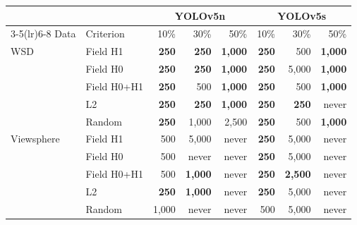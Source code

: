 \begin{tabular}{llrrrrrr}
\toprule
 & & \multicolumn{3}{c}{YOLOv5n} & \multicolumn{3}{c}{YOLOv5s} \\
\cmidrule(lr){3-5}\cmidrule(lr){6-8}
Data & Criterion & 10\% & 30\% & 50\% & 10\% & 30\% & 50\% \\
\midrule
WSD & Field H1 & \textbf{250} & \textbf{250} & \textbf{1,000} & \textbf{250} & 500 & \textbf{1,000} \\
 & Field H0 & \textbf{250} & \textbf{250} & \textbf{1,000} & \textbf{250} & 5,000 & \textbf{1,000} \\
 & Field H0+H1 & \textbf{250} & 500 & \textbf{1,000} & \textbf{250} & 500 & \textbf{1,000} \\
 & L2 & \textbf{250} & \textbf{250} & \textbf{1,000} & \textbf{250} & \textbf{250} & never \\
 & Random & \textbf{250} & 1,000 & 2,500 & \textbf{250} & 500 & \textbf{1,000} \\
\midrule
Viewsphere & Field H1 & 500 & 5,000 & never & \textbf{250} & 5,000 & never \\
 & Field H0 & 500 & never & never & \textbf{250} & 5,000 & never \\
 & Field H0+H1 & 500 & \textbf{1,000} & never & \textbf{250} & \textbf{2,500} & never \\
 & L2 & \textbf{250} & \textbf{1,000} & never & \textbf{250} & 5,000 & never \\
 & Random & 1,000 & never & never & 500 & 5,000 & never \\
\bottomrule
\end{tabular}
